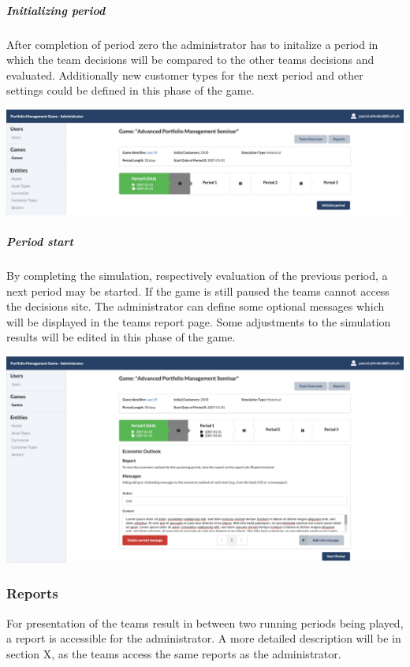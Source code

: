 \subparagraph{Initializing period}
After completion of period zero the administrator has to initalize a period in which the team decisions will be compared to the other teams decisions and evaluated. Additionally new customer types for the next period and other settings could be defined in this phase of the game.
\begin{center}
  \includegraphics[scale=0.2]{img/application-overview/administrator/08_period_initialization.png}
\end{center}

\subparagraph{Period start}
By completing the simulation, respectively evaluation of the previous period, a next period may be started. If the game is still paused the teams cannot access the decisions site. The administrator can define some optional messages which will be displayed in the teams report page. Some adjustments to the simulation results will be edited in this phase of the game.
\begin{center}
  \includegraphics[scale=0.2]{img/application-overview/administrator/09_period_start.png}
\end{center}

\subsubsection{Reports}
For presentation of the teams result in between two running periods being played, a report is accessible for the administrator. A more detailed description will be in section X, as the teams access the same reports as the administrator.



